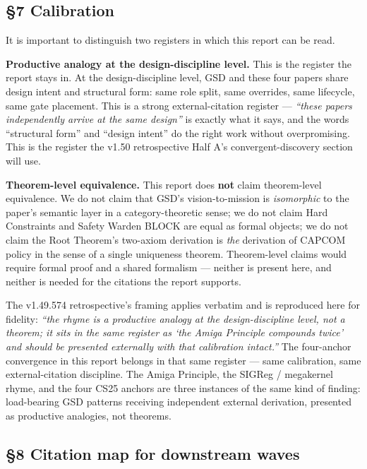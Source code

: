 \documentclass[11pt,letterpaper]{article}
\begin{document}
\subsection{§7 Calibration}

It is important to distinguish two registers in which this report can be
read.

\textbf{Productive analogy at the design-discipline level.} This is the
register the report stays in. At the design-discipline level, GSD and
these four papers share design intent and structural form: same role
split, same overrides, same lifecycle, same gate placement. This is a
strong external-citation register --- \emph{``these papers independently
arrive at the same design''} is exactly what it says, and the words
``structural form'' and ``design intent'' do the right work without
overpromising. This is the register the v1.50 retrospective Half A's
convergent-discovery section will use.

\textbf{Theorem-level equivalence.} This report does \textbf{not} claim
theorem-level equivalence. We do not claim that GSD's vision-to-mission
is \emph{isomorphic} to the paper's semantic layer in a
category-theoretic sense; we do not claim Hard Constraints and Safety
Warden BLOCK are equal as formal objects; we do not claim the Root
Theorem's two-axiom derivation is \emph{the} derivation of CAPCOM policy
in the sense of a single uniqueness theorem. Theorem-level claims would
require formal proof and a shared formalism --- neither is present here,
and neither is needed for the citations the report supports.

The v1.49.574 retrospective's framing applies verbatim and is reproduced
here for fidelity: \emph{``the rhyme is a productive analogy at the
design-discipline level, not a theorem; it sits in the same register as
`the Amiga Principle compounds twice' and should be presented externally
with that calibration intact.''} The four-anchor convergence in this
report belongs in that same register --- same calibration, same
external-citation discipline. The Amiga Principle, the SIGReg /
megakernel rhyme, and the four CS25 anchors are three instances of the
same kind of finding: load-bearing GSD patterns receiving independent
external derivation, presented as productive analogies, not theorems.

\subsection{§8 Citation map for downstream
waves}
\end{document}

